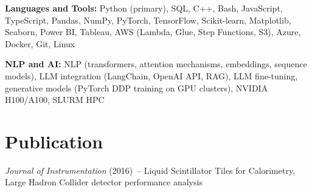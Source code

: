 \documentclass[10pt,letterpaper]{moderncv}
\begin{document}
\textbf{Languages and Tools:} Python (primary), SQL, C++, Bash, JavaScript, TypeScript, Pandas, NumPy, PyTorch, TensorFlow, Scikit-learn, Matplotlib, Seaborn, Power BI, Tableau, AWS (Lambda, Glue, Step Functions, S3), Azure, Docker, Git, Linux

\textbf{NLP and AI:} NLP (transformers, attention mechanisms, embeddings, sequence models), LLM integration (LangChain, OpenAI API, RAG), LLM fine-tuning, generative models (PyTorch DDP training on GPU clusters), NVIDIA H100/A100, SLURM HPC

\vspace*{2mm}
\section{Publication}
\vspace*{1mm}
\textit{Journal of Instrumentation} (2016)~-- Liquid Scintillator Tiles for Calorimetry, Large Hadron Collider detector performance analysis
\end{document}
